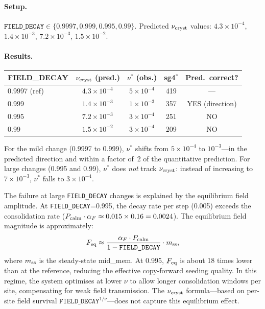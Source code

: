 \documentclass[11pt]{article}
\begin{document}
\paragraph{Setup.}
$\texttt{FIELD\_DECAY} \in \{0.9997, 0.999, 0.995, 0.99\}$.
Predicted $\nu_{\rm cryst}$ values: $4.3\times10^{-4}$, $1.4\times10^{-3}$,
$7.2\times10^{-3}$, $1.5\times10^{-2}$.

\paragraph{Results.}
\begin{center}
\begin{tabular}{lcccc}
\toprule
FIELD\_DECAY & $\nu_{\rm cryst}$ (pred.) & $\nu^*$ (obs.) & sg4$^*$ & Pred.\ correct? \\
\midrule
0.9997 (ref) & $4.3\times10^{-4}$ & $5\times10^{-4}$ & 419 & --- \\
0.999        & $1.4\times10^{-3}$ & $1\times10^{-3}$ & 357 & YES (direction) \\
0.995        & $7.2\times10^{-3}$ & $3\times10^{-4}$ & 251 & NO \\
0.99         & $1.5\times10^{-2}$ & $3\times10^{-4}$ & 209 & NO \\
\bottomrule
\end{tabular}
\end{center}

For the mild change (0.9997 to 0.999), $\nu^*$ shifts from $5\times10^{-4}$ to
$10^{-3}$---in the predicted direction and within a factor of~2 of the quantitative
prediction.
For large changes (0.995 and 0.99), $\nu^*$ does \emph{not} track $\nu_{\rm cryst}$:
instead of increasing to $7\times10^{-3}$, $\nu^*$ falls to $3\times10^{-4}$.

The failure at large \texttt{FIELD\_DECAY} changes is explained by the
equilibrium field amplitude.
At \texttt{FIELD\_DECAY}=0.995, the decay rate per step (0.005) exceeds the
consolidation rate ($P_{\rm calm} \cdot \alpha_F \approx 0.015 \times 0.16 = 0.0024$).
The equilibrium field magnitude is approximately:
\begin{equation}
  F_{\rm eq} \approx \frac{\alpha_F \cdot P_{\rm calm}}{1 - \texttt{FIELD\_DECAY}}
  \cdot m_{\rm ss},
  \label{eq:Feq}
\end{equation}
where $m_{\rm ss}$ is the steady-state mid\_mem.
At 0.995, $F_{\rm eq}$ is about 18 times lower than at the reference,
reducing the effective copy-forward seeding quality.
In this regime, the system optimises at lower $\nu$ to allow longer consolidation
windows per site, compensating for weak field transmission.
The $\nu_{\rm cryst}$ formula---based on per-site field survival
$\texttt{FIELD\_DECAY}^{1/\nu}$---does not capture this equilibrium effect.
\end{document}
